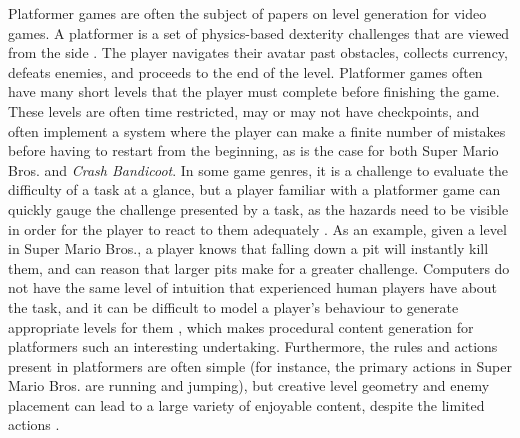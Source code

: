 Platformer games are often the subject of papers on level generation for video games. A
platformer is a set of physics-based dexterity challenges that are viewed from the side
\cite{shaker2011}. The player navigates their avatar past obstacles, collects currency,
defeats enemies, and proceeds to the end of the level. Platformer games often have many 
short levels that the player must complete before finishing the game. These levels are
often time restricted, may or may not have checkpoints, and often implement a system where
the player can make a finite number of mistakes before having to restart from the beginning,
as is the case for both Super Mario Bros. and \emph{Crash Bandicoot}. In some game genres,
it is a challenge to evaluate the difficulty of a task at a glance, but a player familiar
with a platformer game can quickly gauge the challenge presented by a task, as the hazards
need to be visible in order for the player to react to them adequately \cite{sorenson2010}.
As an example, given a level in Super Mario Bros., a player knows that falling down a pit 
will instantly kill them, and can reason that larger pits make for a greater challenge.
Computers do not have the same level of intuition that experienced human players have about
the task, and it can be difficult to model a player's behaviour to generate appropriate
levels for them \cite{shaker2011}, which makes procedural content generation for platformers
such an interesting undertaking. Furthermore, the rules and actions present in platformers
are often simple (for instance, the primary actions in Super Mario Bros. are running and
jumping), but creative level geometry and enemy placement can lead to a large variety of
enjoyable content, despite the limited actions \cite{dahlskog2012}.